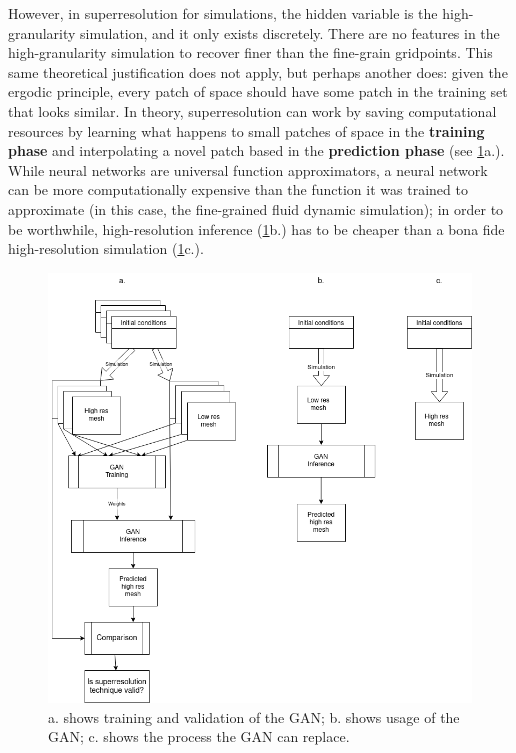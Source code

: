 However, in superresolution for simulations, the hidden variable is the high-granularity simulation, and it only exists discretely. There are no features in the high-granularity simulation to recover finer than the fine-grain gridpoints. This same theoretical justification does not apply, but perhaps another does: given the ergodic principle, every patch of space should have some patch in the training set that looks similar. In theory, superresolution can work by saving computational resources by learning what happens to small patches of space in the \textbf{training phase} and interpolating a novel patch based in the \textbf{prediction phase} (see \cref{gan-for-superresolution}a.). While neural networks are universal function approximators, a neural network can be more computationally expensive than the function it was trained to approximate (in this case, the fine-grained fluid dynamic simulation); in order to be worthwhile, high-resolution inference (\cref{gan-for-superresolution}b.) has to be cheaper than a bona fide high-resolution simulation (\cref{gan-for-superresolution}c.).

\begin{figure}[h!]
  \includegraphics[width=\textwidth]{GAN_for_superresolution.drawio.png}
  \caption{a. shows training and validation of the GAN; b. shows usage of the GAN; c. shows the process the GAN can replace.}
  \label{gan-for-superresolution}
\end{figure}

